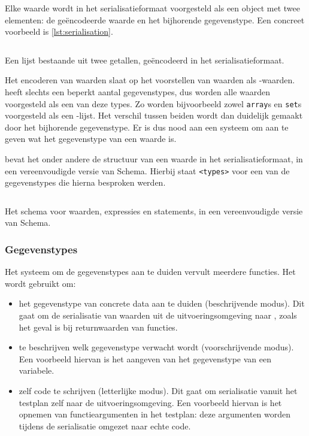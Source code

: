 Elke waarde wordt in het serialisatieformaat voorgesteld als een object met twee elementen: de geëncodeerde waarde en het bijhorende gegevenstype.
Een concreet voorbeeld is \cref{lst:serialisation}.

\begin{listing}
    \inputminted{json}{code/testplan-value-list.json}
    \caption{Een lijst bestaande uit twee getallen, geëncodeerd in het serialisatieformaat.}
    \label{lst:serialisation}
\end{listing}

Het encoderen van waarden slaat op het voorstellen van waarden als -waarden.
 heeft slechts een beperkt aantal gegevenstypes, dus worden alle waarden voorgesteld als een van deze types.
Zo worden bijvoorbeeld zowel \texttt{array}s en \texttt{set}s voorgesteld als een -lijst.
Het verschil tussen beiden wordt dan duidelijk gemaakt door het bijhorende gegevenstype.
Er is dus nood aan een systeem om aan te geven wat het gegevenstype van een waarde is.

 bevat het onder andere de structuur van een waarde in het serialisatieformaat, in een vereenvoudigde versie van  Schema.
Hierbij staat \texttt{<types>} voor een van de gegevenstypes die hierna besproken werden.

\begin{listing}
    \inputminted{json}{code/type-schema.json}
    \caption{Het schema voor waarden, expressies en statements, in een vereenvoudigde versie van  Schema.}
    \label{lst:type-schema}
\end{listing}

\subsubsection{Gegevenstypes}

Het systeem om de gegevenstypes aan te duiden vervult meerdere functies.
Het wordt gebruikt om:

\begin{itemize}
    \item het gegevenstype van concrete data aan te duiden (beschrijvende modus).
    Dit gaat om de serialisatie van waarden uit de uitvoeringsomgeving naar \tested{}, zoals het geval is bij returnwaarden van functies.
    \item te beschrijven welk gegevenstype verwacht wordt (voorschrijvende modus).
    Een voorbeeld hiervan is het aangeven van het gegevenstype van een variabele.
    \item zelf code te schrijven (letterlijke modus).
    Dit gaat om serialisatie vanuit het testplan zelf naar de uitvoeringsomgeving.
    Een voorbeeld hiervan is het opnemen van functieargumenten in het testplan: deze argumenten worden tijdens de serialisatie omgezet naar echte code.
\end{itemize}


